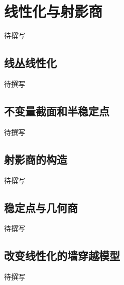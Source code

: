 
% 
% 

\section{线性化与射影商}
\label{g5:sec:3402}

待撰写

\subsection{线丛线性化}
\label{g5:subsec:3402:01}
待撰写

\subsection{不变量截面和半稳定点}
\label{g5:subsec:3402:02}
待撰写

\subsection{射影商的构造}
\label{g5:subsec:3402:03}
待撰写

\subsection{稳定点与几何商}
\label{g5:subsec:3402:04}
待撰写

\subsection{改变线性化的墙穿越模型}
\label{g5:subsec:3402:05}
待撰写
